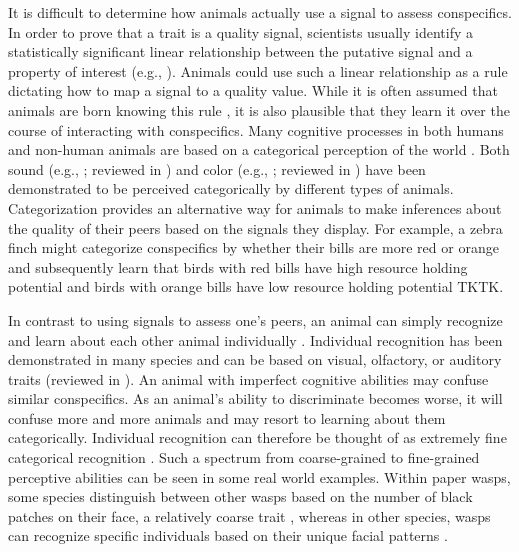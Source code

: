 It is difficult to determine how animals actually use a signal to assess conspecifics. In order to prove that a trait is a quality signal, scientists usually identify a statistically significant linear relationship between the putative signal and a property of interest (e.g., \citep{Rohwer:1981vn,Rohwer:1982fk,Ripoll:2004vn,Tibbetts:2004kx}). Animals could use such a linear relationship as a rule dictating how to map a signal to a quality value. While it is often assumed that animals are born knowing this rule \citep{sheehan2016evotradeoff}, it is also plausible that they learn it over the course of interacting with conspecifics. Many cognitive processes in both humans and non-human animals are based on a categorical perception of the world \citep{Harnad:1990ux}. Both sound (e.g., \citep{Wyttenbach:1996wj,Nelson:1989rt}; reviewed in \citep{Bornstein:1987ec,Ehret:1987jh}) and color (e.g., \citep{Lim:2016ye}; reviewed in \citep{Bornstein:1987ec}) have been demonstrated to be perceived categorically by different types of animals. Categorization provides an alternative way for animals to make inferences about the quality of their peers based on the signals they display. For example, a zebra finch might categorize conspecifics by whether their bills are more red or orange and subsequently learn that birds with red bills have high resource holding potential and birds with orange bills have low resource holding potential TKTK.   
 
In contrast to using signals to assess one's peers, an animal can simply recognize and learn about each other animal individually \citep{sheehan2016evotradeoff}. Individual recognition has been demonstrated in many species and can be based on visual, olfactory, or auditory traits (reviewed in \citep{Tibbetts2007IndividualDifferent}). An animal with imperfect cognitive abilities may confuse similar conspecifics. As an animal's ability to discriminate becomes worse, it will confuse more and more animals and may resort to learning about them categorically. Individual recognition can therefore be thought of as extremely fine categorical recognition \citep{Barnard:1979fk}. Such a spectrum from coarse-grained to fine-grained perceptive abilities can be seen in some real world examples. Within paper wasps, some species distinguish between other wasps based on the number of black patches on their face, a relatively coarse trait \citep{Tibbetts:2004kx}, whereas in other species, wasps can recognize specific individuals based on their unique facial patterns \citep{Tibbetts:2002ys}. 

